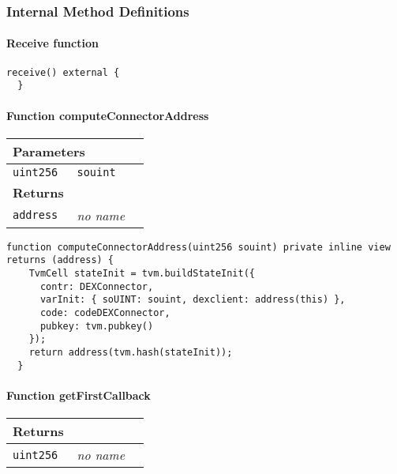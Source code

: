 \subsubsection{Internal Method Definitions}


\paragraph{Receive function}

\vspace{2cm}

\begin{lstlisting}[firstnumber=413]
  receive() external {
  }
\end{lstlisting}

\paragraph{Function computeConnectorAddress}


\ifsoltables
\noindent\begin{tabular}{|l|l|p{5cm}|}\hline
\multicolumn{3}{|l|}{\bf Parameters}\\\hline
\tt uint256 & \tt souint &\\\hline
\multicolumn{3}{|l|}{\bf Returns}\\\hline
\tt address & {\em no name} &\\\hline
\end{tabular}
\fi

\vspace{2cm}

\begin{lstlisting}[firstnumber=142]
  function computeConnectorAddress(uint256 souint) private inline view returns (address) {
    TvmCell stateInit = tvm.buildStateInit({
      contr: DEXConnector,
      varInit: { soUINT: souint, dexclient: address(this) },
      code: codeDEXConnector,
      pubkey: tvm.pubkey()
    });
    return address(tvm.hash(stateInit));
  }
\end{lstlisting}

\paragraph{Function getFirstCallback}


\ifsoltables
\noindent\begin{tabular}{|l|l|p{5cm}|}\hline
\multicolumn{3}{|l|}{\bf Returns}\\\hline
\tt uint256 & {\em no name} &\\\hline
\end{tabular}
\fi

